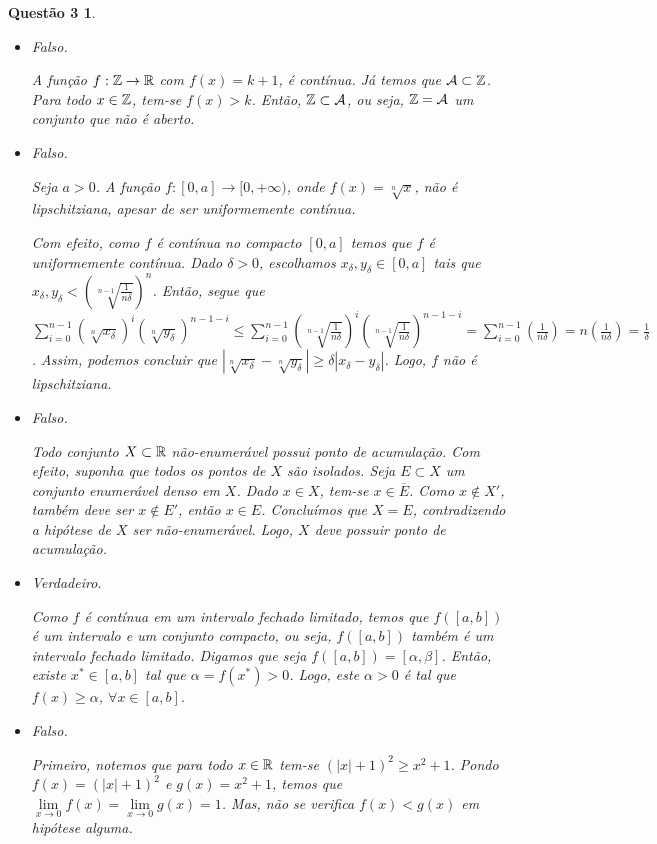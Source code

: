 \documentclass[a4paper,12pt]{article}
\newtheorem*{3}{Questão 3}
\begin{document}
\begin{3}
\begin{itemize}
		Com efeito, seja $n \in \Bbb Z$, temos que $\lim_{x\to n}f(x) = 0 \neq 1 = f(n)$. Logo, $f$ não é contínua em $n$.
		
		\item Falso.
		
		A função $f: \Bbb Z \to \Bbb R$ com $f(x) = k + 1$, é contínua. Já temos que $\mathcal{A} \subset \Bbb Z$. Para todo $x \in \Bbb Z$, tem-se $f(x) > k$. Então, $\Bbb Z \subset \mathcal{A}$, ou seja, $\Bbb Z = \mathcal{A}$ um conjunto que não é aberto.
		
		\item Falso.
		
		Seja $a > 0$. A função $f: [0,a] \to [0,+\infty)$, onde $f(x) = \sqrt[n]{x}$, não é lipschitziana, apesar de ser uniformemente contínua.
		
		Com efeito, como $f$ é contínua no compacto $[0,a]$ temos que $f$ é uniformemente contínua. Dado $\delta > 0$, escolhamos $x_{\delta}, y_{\delta} \in [0,a]$ tais que $x_{\delta}, y_{\delta} < (\sqrt[n-1]{\frac{1}{n\delta}})^n$. Então, segue que $\sum_{i=0}^{n-1}(\sqrt[n]{x_{\delta}})^i(\sqrt[n]{y_{\delta}})^{n-1-i} \leq \sum_{i=0}^{n-1}(\sqrt[n-1]{\frac{1}{n\delta}})^i(\sqrt[n-1]{\frac{1}{n\delta}})^{n-1-i} = \sum_{i=0}^{n-1}(\frac{1}{n\delta}) = n(\frac{1}{n\delta}) = \frac{1}{\delta}$. Assim, podemos concluir que $|\sqrt[n]{x_{\delta}} - \sqrt[n]{y_{\delta}}| \geq \delta|x_{\delta} - y_{\delta}|$. Logo, $f$ não é lipschitziana.
		
		\item Falso.
		
		Todo conjunto $X \subset \Bbb R$ não-enumerável possui ponto de acumulação. Com efeito, suponha que todos os pontos de $X$ são isolados. Seja $E \subset X$ um conjunto enumerável denso em $X$. Dado $x \in X$, tem-se $x \in \overline{E}$. Como $x \notin X'$, também deve ser $x \notin E'$, então $x \in E$. Concluímos que $X = E$, contradizendo a hipótese de $X$ ser não-enumerável. Logo, $X$ deve possuir ponto de acumulação.
		
		\item Verdadeiro.
		
		Como $f$ é contínua em um intervalo fechado limitado, temos que $f([a,b])$ é um intervalo e um conjunto compacto, ou seja, $f([a,b])$ também é um intervalo fechado limitado. Digamos que seja $f([a,b]) = [\alpha, \beta]$. Então, existe $x^* \in [a,b]$ tal que $\alpha = f(x^*) > 0$. Logo, este $\alpha > 0$ é tal que $f(x) \geq \alpha$, $\forall x \in [a,b]$.
		
		\item Falso.
		
		Primeiro, notemos que para todo $x \in \Bbb R$ tem-se $(|x| + 1)^2 \geq x^2 + 1$. Pondo $f(x) = (|x| + 1)^2$ e $g(x) = x^2 + 1$, temos que $\lim\limits_{x \to 0}f(x) = \lim\limits_{x \to 0}g(x) = 1$. Mas, não se verifica $f(x) < g(x)$ em hipótese alguma.
		
	\end{itemize}

\end{3}
\end{document}
